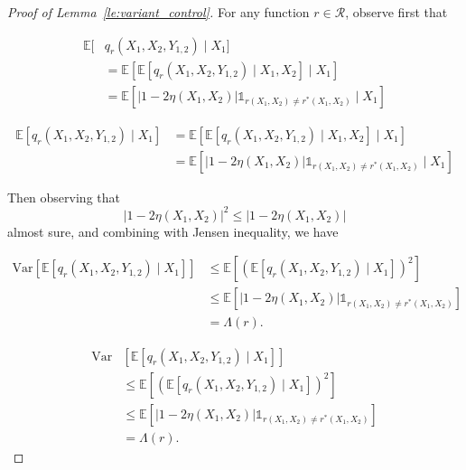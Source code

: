 \documentclass[letterpaper]{article} %
\def\DoubleColumn{}
\def\DoubleColumnEnd{}
\def\SingleColumn{}
\def\SingleColumnEnd{}
\newcommand{\E}{\mathbb{E}}
\newcommand{\Var}{\text{Var}}
\newcommand{\indicator}{\mathds 1}
\begin{document}

\begin{proof}[Proof of Lemma~\ref{le:variant_control}] %
    For any function $r\in\mathcal{R}$, observe first that
    \DoubleColumn
    \begin{align*}
        \E[&q_r(X_1,X_2,Y_{1,2})\mid X_1]\\
        &= \E[\E[q_r(X_1,X_2,Y_{1,2})\mid X_1,X_2]\mid X_1]\\
        &= \E[|1-2\eta(X_1,X_2)|\indicator{}_{r(X_1,X_2)\neq r^*(X_1,X_2)}\mid X_1]
    \end{align*}
    \DoubleColumnEnd
    \SingleColumn
    \begin{align*}
        \E[q_r(X_1,X_2,Y_{1,2})\mid X_1]&= \E[\E[q_r(X_1,X_2,Y_{1,2})\mid X_1,X_2]\mid X_1]\\
        &= \E[|1-2\eta(X_1,X_2)|\indicator{}_{r(X_1,X_2)\neq r^*(X_1,X_2)}\mid X_1]
    \end{align*}
    \SingleColumnEnd
    Then observing that
    \[|1-2\eta(X_1,X_2)|^2\le |1-2\eta(X_1,X_2)|\]
    almost sure, and combining with Jensen inequality, we have
    \SingleColumn
    \begin{align*}
        \Var[\E[q_r(X_1,X_2,Y_{1,2})\mid X_1]] & \le \E[(\E[q_r(X_1,X_2,Y_{1,2})\mid X_1])^2]\\
        &\le \E[|1-2\eta(X_1,X_2)|\indicator{}_{r(X_1,X_2)\neq r^*(X_1,X_2)}]\\
        &= \Lambda(r).
    \end{align*}
    \SingleColumnEnd
    \DoubleColumn
    \begin{align*}
        \Var&[\E[q_r(X_1,X_2,Y_{1,2})\mid X_1]] \\
        & \le \E[(\E[q_r(X_1,X_2,Y_{1,2})\mid X_1])^2]\\
        &\le \E[|1-2\eta(X_1,X_2)|\indicator{}_{r(X_1,X_2)\neq r^*(X_1,X_2)}]\\
        &= \Lambda(r).
    \end{align*}
    \DoubleColumnEnd
\end{proof}
\end{document}
